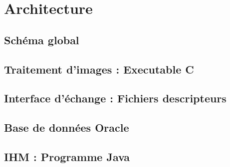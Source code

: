 \section{Architecture}
	\subsection{Schéma global}
	\subsection{Traitement d'images : Executable C}
	\subsection{Interface d'échange : Fichiers descripteurs}
	\subsection{Base de données Oracle}
	\subsection{IHM : Programme Java}